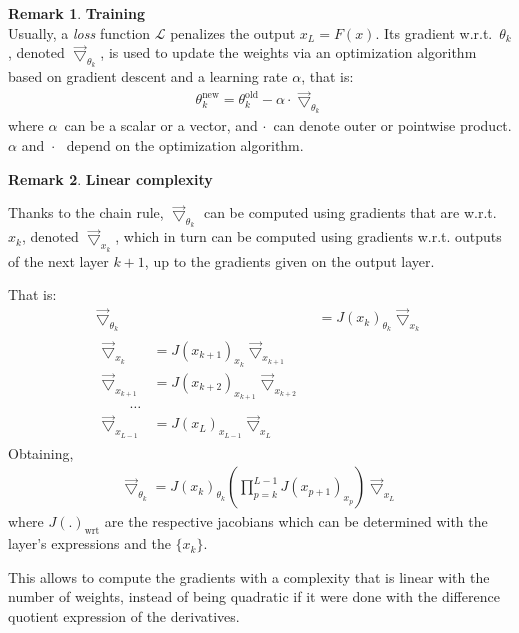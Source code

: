 \documentclass{article}
\theoremstyle{definition}
\newtheorem{remark}{Remark}
\newcommand{\ovec}{}
\begin{document}
\begin{remark}\textbf{Training}\\
Usually, a \emph{loss} function $\mathcal{L}$ penalizes the output $x_L = F(\ovec{x})$. Its gradient w.r.t.~$\theta_k$, denoted $\vec{\bigtriangledown}_{\theta_k}$, is used to update the weights via an optimization algorithm based on gradient descent and a learning rate $\alpha$, that is:
\begin{gather}
\theta_k^{\text{new}} = \theta_k^{\text{old}} - \alpha \cdot \vec{\bigtriangledown}_{\theta_k}
\end{gather}
where $\alpha$~can be a scalar or a vector, and $\cdot$~can denote outer or pointwise product. $\alpha$ and~$\cdot$~ depend on the optimization algorithm.
\end{remark}

\begin{remark}\textbf{Linear complexity}\\
{Thanks to the chain rule, $\vec{\bigtriangledown}_{\theta_k}$ can be computed using gradients that are w.r.t. $\ovec{x_k}$, denoted $\vec{\bigtriangledown}_{x_k}$, which in turn can be computed using gradients w.r.t. outputs of the next layer $k+1$, up to the gradients given on the output layer.

That is:
\begin{align}
  \vec{\bigtriangledown}_{\theta_k} & = J(\ovec{x_k})_{\theta_k} \vec{\bigtriangledown}_{x_k} \\
  \begin{split}
  \vec{\bigtriangledown}_{x_k} & = J(\ovec{x_{k+1}})_{x_k} \vec{\bigtriangledown}_{x_{k+1}} \\
  \vec{\bigtriangledown}_{x_{k+1}} & = J(\ovec{x_{k+2}})_{x_{k+1}} \vec{\bigtriangledown}_{x_{k+2}} \\
  \quad \quad \ldots\\
  \vec{\bigtriangledown}_{x_{L-1}} & = J(\ovec{x_{L}})_{x_{L-1}} \vec{\bigtriangledown}_{x_{L}}
  \label{eq:bp}
  \end{split}
\end{align}
Obtaining,
\begin{align}
  \vec{\bigtriangledown}_{\theta_k} = J(\ovec{x_k})_{\theta_k} (\prod_{p=k}^{L-1} J(\ovec{x_{p+1}})_{x_p}) \vec{\bigtriangledown}_{x_L}
\end{align}
where $J(.)_{\text{wrt}}$ are the respective jacobians which can be determined with the layer's expressions and the $\{x_k\}$.

This allows to compute the gradients with a complexity that is linear with the number of weights, instead of being quadratic if it were done with the difference quotient expression of the derivatives.}
\end{remark}
\end{document}
